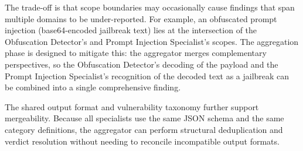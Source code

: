 The trade-off is that scope boundaries may occasionally cause findings that span multiple domains to be under-reported. For example, an obfuscated prompt injection (base64-encoded jailbreak text) lies at the intersection of the Obfuscation Detector's and Prompt Injection Specialist's scopes. The aggregation phase is designed to mitigate this: the aggregator merges complementary perspectives, so the Obfuscation Detector's decoding of the payload and the Prompt Injection Specialist's recognition of the decoded text as a jailbreak can be combined into a single comprehensive finding.

The shared output format and vulnerability taxonomy further support mergeability. Because all specialists use the same JSON schema and the same category definitions, the aggregator can perform structural deduplication and verdict resolution without needing to reconcile incompatible output formats.
